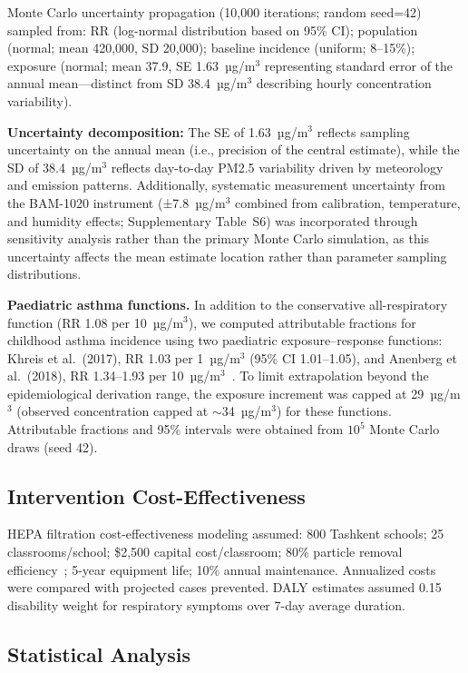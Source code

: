 \documentclass[11pt,a4paper]{article}
\begin{document}
Monte Carlo uncertainty propagation (10,000 iterations; random seed=42) sampled from: RR (log-normal distribution based on 95\% CI); population (normal; mean 420,000, SD 20,000); baseline incidence (uniform; 8--15\%); exposure (normal; mean 37.9, SE 1.63~µg/m$^3$ representing standard error of the annual mean---distinct from SD 38.4~µg/m$^3$ describing hourly concentration variability).

\textbf{Uncertainty decomposition:} The SE of 1.63~µg/m$^3$ reflects sampling uncertainty on the annual mean (i.e., precision of the central estimate), while the SD of 38.4~µg/m$^3$ reflects day-to-day PM2.5 variability driven by meteorology and emission patterns. Additionally, systematic measurement uncertainty from the BAM-1020 instrument (±7.8~µg/m$^3$ combined from calibration, temperature, and humidity effects; Supplementary Table~S6) was incorporated through sensitivity analysis rather than the primary Monte Carlo simulation, as this uncertainty affects the mean estimate location rather than parameter sampling distributions.

\textbf{Paediatric asthma functions.} In addition to the conservative all-respiratory function (RR 1.08 per 10~µg/m$^3$), we computed attributable fractions for childhood asthma incidence using two paediatric exposure--response functions: Khreis et al.\ (2017), RR 1.03 per 1~µg/m$^3$ (95\% CI 1.01--1.05), and Anenberg et al.\ (2018), RR 1.34--1.93 per 10~µg/m$^3$~\cite{khreis2017exposure,anenberg2019global}. To limit extrapolation beyond the epidemiological derivation range, the exposure increment was capped at 29~µg/m$^3$ (observed concentration capped at $\sim$34~µg/m$^3$) for these functions. Attributable fractions and 95\% intervals were obtained from $10^5$ Monte Carlo draws (seed 42).

\subsection{Intervention Cost-Effectiveness}

HEPA filtration cost-effectiveness modeling assumed: 800 Tashkent schools; 25 classrooms/school; \$2,500 capital cost/classroom; 80\% particle removal efficiency~\cite{fisk2017association,qi2017large}; 5-year equipment life; 10\% annual maintenance. Annualized costs were compared with projected cases prevented. DALY estimates assumed 0.15 disability weight for respiratory symptoms over 7-day average duration.

\subsection{Statistical Analysis}
\end{document}
